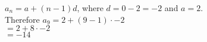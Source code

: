 $a_n=a+(n-1)d$, where $d=0-2=-2$ and $a=2$.\\Therefore $a_{9}=2+(9-1)\cdot -2$\\$=2+8 \cdot-2$\\$=-14$
